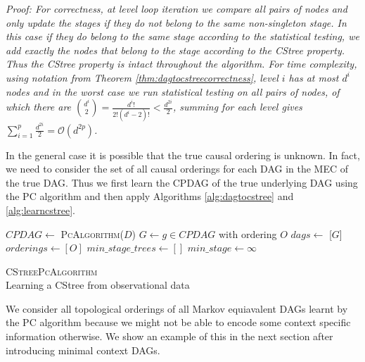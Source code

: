 \documentclass{tufte-book}
\begin{document}
\textit{Proof:
For correctness, at level loop iteration we compare all pairs of nodes and only update the stages if they do not belong to the same non-singleton stage. In this case if they do belong to the same stage according to the statistical testing, we add exactly the nodes that belong to the stage according to the CStree property. Thus the CStree property is intact throughout the algorithm. For time complexity, using notation from Theorem \ref{thm:dagtocstreecorrectness}, level $i$ has at most $d^i$ nodes and in the worst case we run statistical testing on all pairs of nodes, of which there are ${d^i \choose 2} = \frac{d^i !}{2! (d^i - 2)!} < \frac{d^{2i}}{2}$, summing for each level gives $\sum_{i=1}^p \frac{d^{2i}}{2}  = \mathcal{O}(d^{2p})$.
}

In the general case it is possible that the true causal ordering is unknown. In fact, we need to consider the set of all causal orderings for each DAG in the MEC of the true DAG. Thus we first learn the CPDAG of the true underlying DAG using the PC algorithm and then apply Algorithms \ref{alg:dagtocstree} and \ref{alg:learncstree}.

\begin{algorithm}\label{alg:cstreepc}
\SetAlgoLined
{}
$CPDAG \gets$ \textsc{PcAlgorithm}($D$)\;
{
$G \gets g \in CPDAG$ with ordering $O$\;
$dags \gets$ [$G$]\;
$orderings \gets [O]$\;
}
$min\_stage\_trees \gets []$\;
$min\_stage \gets \infty$\;
\caption{\textsc{CStreePcAlgorithm} \\ Learning a CStree from observational data}

\end{algorithm}


We consider all topological orderings of all Markov equiavalent DAGs learnt by the PC algorithm because we might not be able to encode some context specific information otherwise. We show an example of this in the next section after introducing minimal context DAGs.
\end{document}
